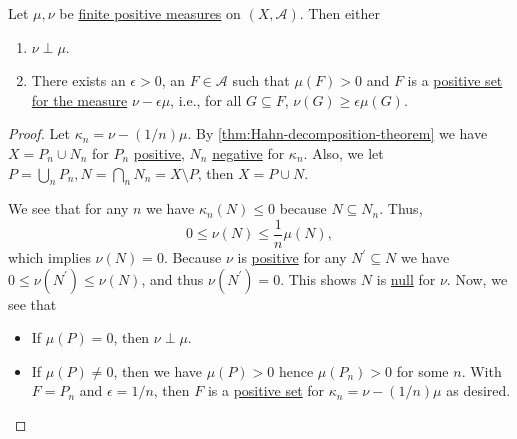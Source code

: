 \begin{lemma}\label{lma:finite-singular}
	Let \(\mu, \nu\) be \hyperref[def:finite-signed-measure]{finite positive measures} on \((X, \mathcal{A})\). Then either
	\begin{enumerate}
		\item \(\nu \perp \mu\).
		\item There exists an \(\epsilon > 0\), an \(F \in \mathcal{A}\) such that \(\mu(F) > 0\) and \(F\) is a
		      \hyperref[def:positive-set-for-a-signed-measure]{positive set for the measure} \(\nu - \epsilon \mu\),
		      i.e., for all \(G \subseteq F\), \(\nu(G) \geq \epsilon \mu(G)\).
	\end{enumerate}
\end{lemma}

\begin{proof}
	Let \(\kappa_n = \nu - (1/n)\mu\). By \autoref{thm:Hahn-decomposition-theorem} we have \(X = P_n \cup N_n\) for \(P_n\)
	\hyperref[def:positive-set-for-a-signed-measure]{positive}, \(N_n\) \hyperref[def:negative-set-for-a-signed-measure]{negative}
	for \(\kappa _n\). Also, we let \(P = \bigcup_n P_n, N = \bigcap_n N_n = X \setminus P\), then \(X = P \cup N\).

	We see that for any \(n\) we have \(\kappa_n(N) \leq 0\) because \(N \subseteq N_n\). Thus,
	\[
		0 \leq \nu(N) \leq \frac{1}{n}\mu(N),
	\]
	which implies \(\nu(N) = 0\). Because \(\nu\) is \hyperref[def:signed-measure]{positive} for any \(N^\prime  \subseteq N\) we have \(0 \leq \nu(N^\prime ) \leq \nu(N)\),
	and thus \(\nu(N^\prime ) = 0\). This shows \(N\) is \hyperref[def:null-set-for-a-signed-measure]{null} for \(\nu \). Now, we see that
	\begin{itemize}
		\item If \(\mu(P) = 0\), then \(\nu \perp \mu\).
		\item If \(\mu(P) \neq 0\), then we have \(\mu (P) > 0\) hence \(\mu(P_n) > 0\) for some \(n\). With \(F = P_n\) and \(\epsilon = 1/n\), then \(F\) is a
		      \hyperref[def:positive-set-for-a-signed-measure]{positive set} for \(\kappa_n = \nu - (1/n)\mu\) as desired.
	\end{itemize}
\end{proof}


